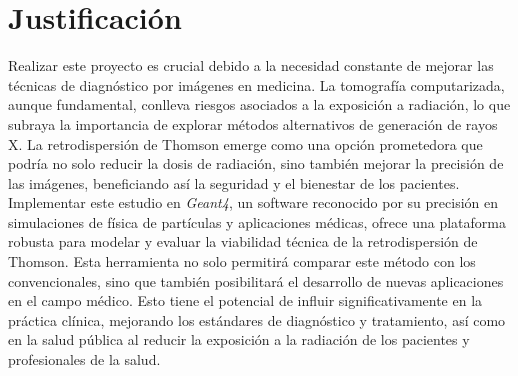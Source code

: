 \vspace*{\fill}


\section{Justificación}




Realizar este proyecto es crucial debido a la necesidad constante de mejorar las técnicas de diagnóstico por imágenes en medicina. La tomografía computarizada, aunque fundamental, conlleva riesgos asociados a la exposición a radiación, lo que subraya la importancia de explorar métodos alternativos de generación de rayos X. La retrodispersión de Thomson emerge como una opción prometedora que podría no solo reducir la dosis de radiación, sino también mejorar la precisión de las imágenes, beneficiando así la seguridad y el bienestar de los pacientes. \\

Implementar este estudio en \textit{Geant4}, un software reconocido por su precisión en simulaciones de física de partículas y aplicaciones médicas, ofrece una plataforma robusta para modelar y evaluar la viabilidad técnica de la retrodispersión de Thomson. Esta herramienta no solo permitirá comparar este método con los convencionales, sino que también posibilitará el desarrollo de nuevas aplicaciones en el campo médico. Esto tiene el potencial de influir significativamente en la práctica clínica, mejorando los estándares de diagnóstico y tratamiento, así como en la salud pública al reducir la exposición a la radiación de los pacientes y profesionales de la salud. \\

